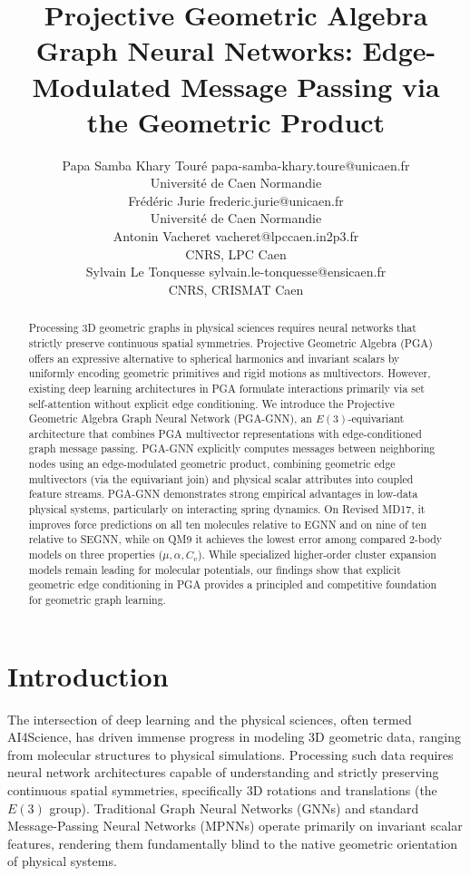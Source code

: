 \documentclass[10pt]{article}
\title{Projective Geometric Algebra Graph Neural Networks: Edge-Modulated Message Passing via the Geometric Product}
\author{\name Papa Samba Khary Touré \email papa-samba-khary.toure@unicaen.fr \\
\addr Université de Caen Normandie \\
\AND
\name Frédéric Jurie \email frederic.jurie@unicaen.fr  \\
\addr Université de Caen Normandie \\
\AND
\name Antonin Vacheret \email vacheret@lpccaen.in2p3.fr  \\
\addr CNRS, LPC Caen \\
\AND
\name Sylvain Le Tonquesse \email sylvain.le-tonquesse@ensicaen.fr  \\
\addr CNRS, CRISMAT Caen}
\begin{document}
\maketitle
\begin{abstract}
    Processing 3D geometric graphs in physical sciences requires neural networks that strictly preserve continuous spatial symmetries. Projective Geometric Algebra (PGA) offers an expressive alternative to spherical harmonics and invariant scalars by uniformly encoding geometric primitives and rigid motions as multivectors. However, existing deep learning architectures in PGA formulate interactions primarily via set self-attention without explicit edge conditioning. We introduce the Projective Geometric Algebra Graph Neural Network (PGA-GNN), an $E(3)$-equivariant architecture that combines PGA multivector representations with edge-conditioned graph message passing. PGA-GNN explicitly computes messages between neighboring nodes using an edge-modulated geometric product, combining geometric edge multivectors (via the equivariant join) and physical scalar attributes into coupled feature streams. PGA-GNN demonstrates strong empirical advantages in low-data physical systems, particularly on interacting spring dynamics. On Revised MD17, it improves force predictions on all ten molecules relative to EGNN and on nine of ten relative to SEGNN, while on QM9 it achieves the lowest error among compared 2-body models on three properties ($\mu, \alpha, C_v$). While specialized higher-order cluster expansion models remain leading for molecular potentials, our findings show that explicit geometric edge conditioning in PGA provides a principled and competitive foundation for geometric graph learning.
\end{abstract}

\section{Introduction}

The intersection of deep learning and the physical sciences, often termed AI4Science, has driven immense progress in modeling 3D geometric data, ranging from molecular structures to physical simulations. Processing such data requires neural network architectures capable of understanding and strictly preserving continuous spatial symmetries, specifically 3D rotations and translations (the $E(3)$ group). Traditional Graph Neural Networks (GNNs) \citep{gcn} and standard Message-Passing Neural Networks (MPNNs) \citep{mpnn} operate primarily on invariant scalar features, rendering them fundamentally blind to the native geometric orientation of physical systems.
\end{document}
